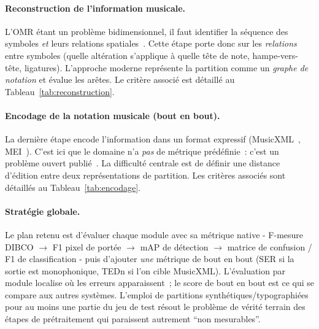 \documentclass[a4paper,10pt]{article}
\begin{document}
\paragraph{Reconstruction de l'information musicale.}
L'OMR étant un problème bidimensionnel, il faut identifier la séquence des symboles \emph{et} leurs relations spatiales~\cite{shatri2020opticalmusicrecognitionstate}. Cette étape porte donc sur les \emph{relations} entre symboles (quelle altération s'applique à quelle tête de note, hampe-vers-tête, ligatures). L'approche moderne représente la partition comme un \emph{graphe de notation} et évalue les arêtes. Le critère associé est détaillé au Tableau~\ref{tab:reconstruction}.

\paragraph{Encodage de la notation musicale (bout en bout).}
La dernière étape encode l'information dans un format expressif (MusicXML~\cite{good2001}, MEI~\cite{roland2002}). C'est ici que le domaine n'a \emph{pas} de métrique prédéfinie~: c'est un problème ouvert publié~\cite{mengarelli2019,hajic2018intrinsic,torras2023}. La difficulté centrale est de définir une distance d'édition entre deux représentations de partition. Les critères associés sont détaillés au Tableau~\ref{tab:encodage}.

\paragraph{Stratégie globale.}
Le plan retenu est d'évaluer chaque module avec sa métrique native - F-mesure DIBCO $\rightarrow$ F1 pixel de portée $\rightarrow$ mAP de détection $\rightarrow$ matrice de confusion / F1 de classification - puis d'ajouter \emph{une} métrique de bout en bout (SER si la sortie est monophonique, TEDn si l'on cible MusicXML). L'évaluation par module localise où les erreurs apparaissent~; le score de bout en bout est ce qui se compare aux autres systèmes. L'emploi de partitions synthétiques/typographiées pour au moins une partie du jeu de test résout le problème de vérité terrain des étapes de prétraitement qui paraissent autrement ``non mesurables''.

\end{document}
